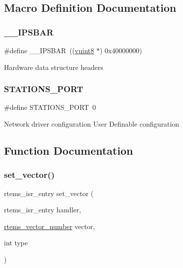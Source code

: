 \subsection{Macro Definition Documentation}
\mbox{\label{group__RTEMSBSPsM68kMCF5225X_gabdb86768904e30373b5aa4cf02a915b6}} 
\subsubsection{\texorpdfstring{\_\_IPSBAR}{\_\_IPSBAR}}
{\footnotesize\ttfamily \#define \+\_\+\+\_\+\+I\+P\+S\+B\+AR~((\mbox{\hyperlink{group__RTEMSBSPsM68kMCF5329_gab2208c2cec6d83509a16c4b4e177bc20}{vuint8}} $\ast$) 0x40000000)}

Hardware data structure headers \mbox{\label{group__RTEMSBSPsM68kMCF5225X_ga809b0470c05eb0ec3f54947b8d217341}} 
\subsubsection{\texorpdfstring{STATIONS\_PORT}{STATIONS\_PORT}}
{\footnotesize\ttfamily \#define S\+T\+A\+T\+I\+O\+N\+S\+\_\+\+P\+O\+RT~0}

Network driver configuration User Definable configuration 

\subsection{Function Documentation}
\mbox{\label{group__RTEMSBSPsM68kMCF5225X_gab3388042c56b34c40be81fd5f028d97e}} 
\subsubsection{\texorpdfstring{set\_vector()}{set\_vector()}}
{\footnotesize\ttfamily rtems\+\_\+isr\+\_\+entry set\+\_\+vector (\begin{DoxyParamCaption}\item[{rtems\+\_\+isr\+\_\+entry}]{handler,  }\item[{\mbox{\hyperlink{group__ClassicINTR_ga3e434c197d99f128e78cae4d9358bd8b}{rtems\+\_\+vector\+\_\+number}}}]{vector,  }\item[{int}]{type }\end{DoxyParamCaption})}



